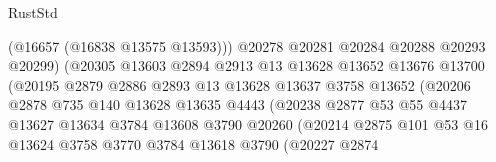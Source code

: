 \begin{lexlean}{RustStd}
\begin{coremodule}
                                      (@16657 (@16838 @13575 @13593)))
                                    @20278
                                    @20281
                                    @20284
                                    @20288
                                    @20293
                                    @20299)
                                  (@20305
                                    @13603
                                    @2894
                                    @2913
                                    @13
                                    @13628
                                    @13652
                                    @13676
                                    @13700
                                    (@20195
                                      @2879
                                      @2886
                                      @2893
                                      @13
                                      @13628
                                      @13637
                                      @3758
                                      @13652
                                      (@20206
                                        @2878
                                        @735
                                        @140
                                        @13628
                                        @13635
                                        @4443
                                        (@20238
                                          @2877
                                          @53
                                          @55
                                          @4437
                                          @13627
                                          @13634
                                          @3784
                                          @13608
                                          @3790
                                          @20260
                                          (@20214
                                            @2875
                                            @101
                                            @53
                                            @16
                                            @13624
                                            @3758
                                            @3770
                                            @3784
                                            @13618
                                            @3790
                                            (@20227
                                              @2874

\end{coremodule}
\end{lexlean}
